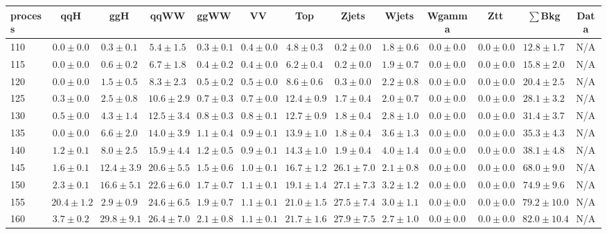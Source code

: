 \begin{table}
{%
 \tiny
 \begin{center}
 \begin{tabular}{l | c c | c c c c c c c c  | c c}
 \hline
 process & qqH & ggH & qqWW & ggWW & VV & Top & Zjets & Wjets & Wgamma & Ztt & $\sum$Bkg & Data \\
 \hline
110 & $0.0\pm0.0$ & $0.3\pm0.1$ & $5.4\pm1.5$ & $0.3\pm0.1$ & $0.4\pm0.0$ & $4.8\pm0.3$ & $0.2\pm0.0$ & $1.8\pm0.6$ & $0.0\pm0.0$ & $0.0\pm0.0$ & $12.8\pm1.7$ & N/A \\
115 & $0.0\pm0.0$ & $0.6\pm0.2$ & $6.7\pm1.8$ & $0.4\pm0.2$ & $0.4\pm0.0$ & $6.2\pm0.4$ & $0.2\pm0.0$ & $1.9\pm0.7$ & $0.0\pm0.0$ & $0.0\pm0.0$ & $15.8\pm2.0$ & N/A \\
120 & $0.0\pm0.0$ & $1.5\pm0.5$ & $8.3\pm2.3$ & $0.5\pm0.2$ & $0.5\pm0.0$ & $8.6\pm0.6$ & $0.3\pm0.0$ & $2.2\pm0.8$ & $0.0\pm0.0$ & $0.0\pm0.0$ & $20.4\pm2.5$ & N/A \\
125 & $0.3\pm0.0$ & $2.5\pm0.8$ & $10.6\pm2.9$ & $0.7\pm0.3$ & $0.7\pm0.0$ & $12.4\pm0.9$ & $1.7\pm0.4$ & $2.0\pm0.7$ & $0.0\pm0.0$ & $0.0\pm0.0$ & $28.1\pm3.2$ & N/A \\
130 & $0.5\pm0.0$ & $4.3\pm1.4$ & $12.5\pm3.4$ & $0.8\pm0.3$ & $0.8\pm0.1$ & $12.7\pm0.9$ & $1.8\pm0.4$ & $2.8\pm1.0$ & $0.0\pm0.0$ & $0.0\pm0.0$ & $31.4\pm3.7$ & N/A \\
135 & $0.0\pm0.0$ & $6.6\pm2.0$ & $14.0\pm3.9$ & $1.1\pm0.4$ & $0.9\pm0.1$ & $13.9\pm1.0$ & $1.8\pm0.4$ & $3.6\pm1.3$ & $0.0\pm0.0$ & $0.0\pm0.0$ & $35.3\pm4.3$ & N/A \\
140 & $1.2\pm0.1$ & $8.0\pm2.5$ & $15.9\pm4.4$ & $1.2\pm0.5$ & $0.9\pm0.1$ & $14.3\pm1.0$ & $1.9\pm0.4$ & $4.0\pm1.4$ & $0.0\pm0.0$ & $0.0\pm0.0$ & $38.1\pm4.8$ & N/A \\
145 & $1.6\pm0.1$ & $12.4\pm3.9$ & $20.6\pm5.5$ & $1.5\pm0.6$ & $1.0\pm0.1$ & $16.7\pm1.2$ & $26.1\pm7.0$ & $2.1\pm0.8$ & $0.0\pm0.0$ & $0.0\pm0.0$ & $68.0\pm9.0$ & N/A \\
150 & $2.3\pm0.1$ & $16.6\pm5.1$ & $22.6\pm6.0$ & $1.7\pm0.7$ & $1.1\pm0.1$ & $19.1\pm1.4$ & $27.1\pm7.3$ & $3.2\pm1.2$ & $0.0\pm0.0$ & $0.0\pm0.0$ & $74.9\pm9.6$ & N/A \\
155 & $20.4\pm1.2$ & $2.9\pm0.9$ & $24.6\pm6.5$ & $1.9\pm0.7$ & $1.1\pm0.1$ & $21.0\pm1.5$ & $27.5\pm7.4$ & $3.0\pm1.1$ & $0.0\pm0.0$ & $0.0\pm0.0$ & $79.2\pm10.0$ & N/A \\
160 & $3.7\pm0.2$ & $29.8\pm9.1$ & $26.4\pm7.0$ & $2.1\pm0.8$ & $1.1\pm0.1$ & $21.7\pm1.6$ & $27.9\pm7.5$ & $2.7\pm1.0$ & $0.0\pm0.0$ & $0.0\pm0.0$ & $82.0\pm10.4$ & N/A \\

\end{tabular}
\end{center}}
\end{table}
